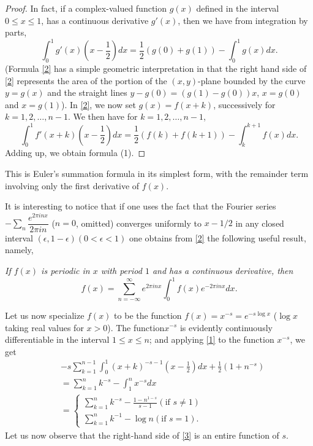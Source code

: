 \begin{proof}
In fact, if a complex-valued function $g(x)$ defined in the interval
$0\leq x\leq 1$, has a continuous derivative $g'(x)$, then we have
from integration by parts,
\begin{equation*}
\int^{1}_{0}g'(x)\left(x -
\frac{1}{2}\right)dx=\frac{1}{2}(g(0)+g(1))-\int^{1}_{0}g(x)dx.\tag{2}\label{2}  
\end{equation*}
(Formula \eqref{2} has a simple geometric interpretation in that the
right hand side of \eqref{2} represents the area of the portion of the
$(x,y)$-plane bounded by the curve $y=g(x)$ and the straight lines
$y-g(0)=(g(1)-g(0))x$, $x=g(0)$ and $x=g(1)$). In \eqref{2}, we now
set $g(x)=f(x+k)$, successively for $k=1,2,\ldots,n-1$. We then have
for $k=1,2,\ldots,n-1$, 
$$
\int^{1}_{0}f'(x+k)\left(x-\frac{1}{2}\right)dx=\frac{1}{2}(f(k)+f(k+1))-\int^{k+1}_{k}f(x)dx. 
$$
Adding up, we obtain formula (1).
\end{proof}

This is Euler's summation formula in its simplest form, with the
remainder term involving only the first derivative of $f(x)$.

It is interesting to notice that if one uses the fact that the Fourier
series $-\sum\limits_{n}\dfrac{e^{2\pi inx}}{2\pi in}$ ($n=0$,
omitted) converges uniformly to $x-1/2$ in any closed interval
$(\epsilon,1-\epsilon)(0<\epsilon<1)$ one obtains from \eqref{2} the
following useful result, namely,

{\em If $f(x)$ is periodic in $x$ with period $1$ and has a continuous
  derivative, then}
$$
f(x)=\sum^{\infty}_{n=-\infty}e^{2\pi in x}\int^{1}_{0}f(x)e^{-2\pi in
  x}dx.
$$

\begin{proofofprop}\label{proofofprop1}
Let us now specialize $f(x)$ to be the function $f(x)=x^{-s} = e^{-s\log
  x}$ ($\log x$ taking real values for $x>0$). The
function\pageoriginale $x^{-s}$ is evidently continuously
differentiable in the interval $1\leq x\leq n$; and applying \eqref{1}
to the function $x^{-s}$, we get
\begin{align*}
&-
  s\sum^{n-1}_{k=1}\int^{1}_{0}(x+k)^{-s-1}\left(x-\frac{1}{2}\right)dx+\frac{1}{2}(1+n^{-s})\\
&=\sum^{n}_{k=1}k^{-s}-\int^{n}_{1}x^{-s}dx\\
&=
\begin{cases}
\sum^{n}_{k=1}k^{-s}-\frac{1-n^{1-s}}{s-1}(\text{if } s\neq 1)\\
\sum^{n}_{k=1}k^{-1}-\log n(\text{if }s=1).
\end{cases}\tag{3}\label{3}
\end{align*}
Let us now observe that the right-hand side of \eqref{3} is an entire
function of $s$.
\end{proofofprop}

